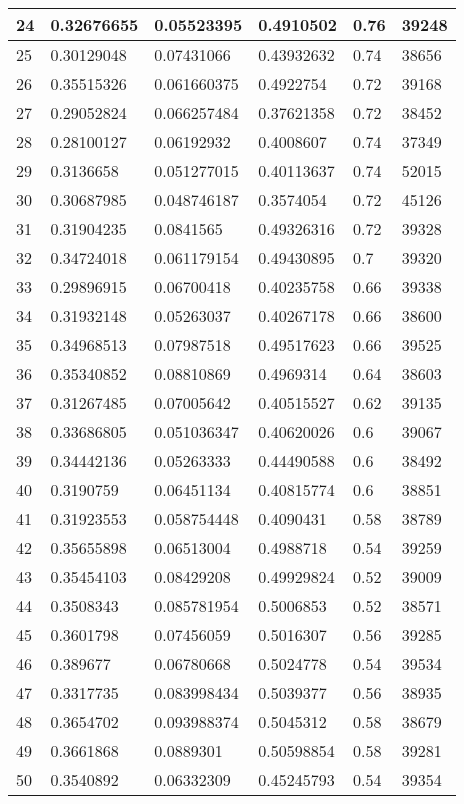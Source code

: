 \begin{longtable}{|l|l|l|l|l|l|}
24 & 0.32676655 & 0.05523395 & 0.4910502 & 0.76 & 39248 \\ \hline 
25 & 0.30129048 & 0.07431066 & 0.43932632 & 0.74 & 38656 \\ \hline 
26 & 0.35515326 & 0.061660375 & 0.4922754 & 0.72 & 39168 \\ \hline 
27 & 0.29052824 & 0.066257484 & 0.37621358 & 0.72 & 38452 \\ \hline 
28 & 0.28100127 & 0.06192932 & 0.4008607 & 0.74 & 37349 \\ \hline 
29 & 0.3136658 & 0.051277015 & 0.40113637 & 0.74 & 52015 \\ \hline 
30 & 0.30687985 & 0.048746187 & 0.3574054 & 0.72 & 45126 \\ \hline 
31 & 0.31904235 & 0.0841565 & 0.49326316 & 0.72 & 39328 \\ \hline 
32 & 0.34724018 & 0.061179154 & 0.49430895 & 0.7 & 39320 \\ \hline 
33 & 0.29896915 & 0.06700418 & 0.40235758 & 0.66 & 39338 \\ \hline 
34 & 0.31932148 & 0.05263037 & 0.40267178 & 0.66 & 38600 \\ \hline 
35 & 0.34968513 & 0.07987518 & 0.49517623 & 0.66 & 39525 \\ \hline 
36 & 0.35340852 & 0.08810869 & 0.4969314 & 0.64 & 38603 \\ \hline 
37 & 0.31267485 & 0.07005642 & 0.40515527 & 0.62 & 39135 \\ \hline 
38 & 0.33686805 & 0.051036347 & 0.40620026 & 0.6 & 39067 \\ \hline 
39 & 0.34442136 & 0.05263333 & 0.44490588 & 0.6 & 38492 \\ \hline 
40 & 0.3190759 & 0.06451134 & 0.40815774 & 0.6 & 38851 \\ \hline 
41 & 0.31923553 & 0.058754448 & 0.4090431 & 0.58 & 38789 \\ \hline 
42 & 0.35655898 & 0.06513004 & 0.4988718 & 0.54 & 39259 \\ \hline 
43 & 0.35454103 & 0.08429208 & 0.49929824 & 0.52 & 39009 \\ \hline 
44 & 0.3508343 & 0.085781954 & 0.5006853 & 0.52 & 38571 \\ \hline 
45 & 0.3601798 & 0.07456059 & 0.5016307 & 0.56 & 39285 \\ \hline 
46 & 0.389677 & 0.06780668 & 0.5024778 & 0.54 & 39534 \\ \hline 
47 & 0.3317735 & 0.083998434 & 0.5039377 & 0.56 & 38935 \\ \hline 
48 & 0.3654702 & 0.093988374 & 0.5045312 & 0.58 & 38679 \\ \hline 
49 & 0.3661868 & 0.0889301 & 0.50598854 & 0.58 & 39281 \\ \hline 
50 & 0.3540892 & 0.06332309 & 0.45245793 & 0.54 & 39354 \\ \hline 
\end{longtable}